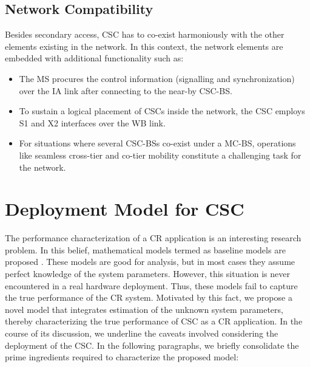 \documentclass[draftcls, onecolumn, 11pt]{IEEEtran}
\begin{document}
\subsection*{Network Compatibility}
Besides secondary access, CSC has to co-exist harmoniously with the other elements existing in the network. In this context, the network elements are embedded with additional functionality such as:
\begin{itemize}
\item The MS procures the control information (signalling and synchronization) over the IA link after connecting to the near-by CSC-BS.  
\item To sustain a logical placement of CSCs inside the network, the CSC employs S1 and X2 interfaces over the WB link. 
\item For situations where several CSC-BSs co-exist under a MC-BS, operations like seamless cross-tier and co-tier mobility constitute a challenging task for the network.
\end{itemize} 
\section{Deployment Model for CSC} \label{sec:DR}

The performance characterization of a CR application is an interesting research problem. In this belief, mathematical models termed as baseline models are proposed \cite{Liang08}. These models are good for analysis, but in most cases they assume perfect knowledge of the system parameters. However, this situation is never encountered in a real hardware deployment. Thus, these models fail to capture the true performance of the CR system. Motivated by this fact, we propose a novel model that integrates estimation of the unknown system parameters, thereby characterizing the true performance of CSC as a CR application. In the course of its discussion, we underline the caveats involved considering the deployment of the CSC. %
In the following paragraphs, we briefly consolidate the prime ingredients required to characterize the proposed model:
\end{document}
